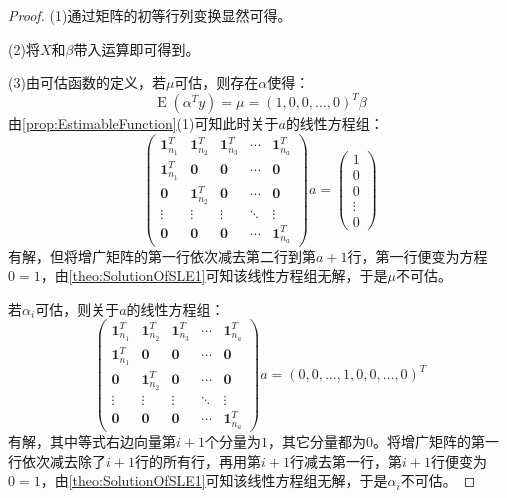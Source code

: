 \begin{proof}
	(1)通过矩阵的初等行列变换显然可得。\par
	(2)将$X$和$\beta$带入运算即可得到。\par
	(3)由可估函数的定义，若$\mu$可估，则存在$\alpha$使得：
	\begin{equation*}
		\operatorname{E}(\alpha^Ty)=\mu=(1,0,0,\dots,0)^T\beta
	\end{equation*}
	由\cref{prop:EstimableFunction}(1)可知此时关于$a$的线性方程组：
	\begin{equation*}
		\begin{pmatrix}
			\mathbf{1}_{n_1}^T & \mathbf{1}_{n_2}^T & \mathbf{1}_{n_3}^T & \cdots & \mathbf{1}_{n_a}^T \\
			\mathbf{1}_{n_1}^T & \mathbf{0} & \mathbf{0} & \cdots & \mathbf{0} \\
			\mathbf{0} & \mathbf{1}_{n_2}^T & \mathbf{0} & \cdots & \mathbf{0} \\
			\vdots & \vdots & \vdots & \ddots & \vdots \\
			\mathbf{0} & \mathbf{0} & \mathbf{0} & \cdots & \mathbf{1}_{n_a}^T
		\end{pmatrix}a=
		\begin{pmatrix}
			1 \\
			0 \\
			0 \\
			\vdots \\
			0
		\end{pmatrix}
	\end{equation*}
	有解，但将增广矩阵的第一行依次减去第二行到第$a+1$行，第一行便变为方程$0=1$，由\cref{theo:SolutionOfSLE1}可知该线性方程组无解，于是$\mu$不可估。\par
	若$\alpha_i$可估，则关于$a$的线性方程组：
	\begin{equation*}
		\begin{pmatrix}
			\mathbf{1}_{n_1}^T & \mathbf{1}_{n_2}^T & \mathbf{1}_{n_3}^T & \cdots & \mathbf{1}_{n_a}^T \\
			\mathbf{1}_{n_1}^T & \mathbf{0} & \mathbf{0} & \cdots & \mathbf{0} \\
			\mathbf{0} & \mathbf{1}_{n_2}^T & \mathbf{0} & \cdots & \mathbf{0} \\
			\vdots & \vdots & \vdots & \ddots & \vdots \\
			\mathbf{0} & \mathbf{0} & \mathbf{0} & \cdots & \mathbf{1}_{n_a}^T
		\end{pmatrix}a=(0,0,\dots,1,0,0,\dots,0)^T
	\end{equation*}
	有解，其中等式右边向量第$i+1$个分量为$1$，其它分量都为$0$。将增广矩阵的第一行依次减去除了$i+1$行的所有行，再用第$i+1$行减去第一行，第$i+1$行便变为$0=1$，由\cref{theo:SolutionOfSLE1}可知该线性方程组无解，于是$\alpha_i$不可估。\par

\end{proof}

